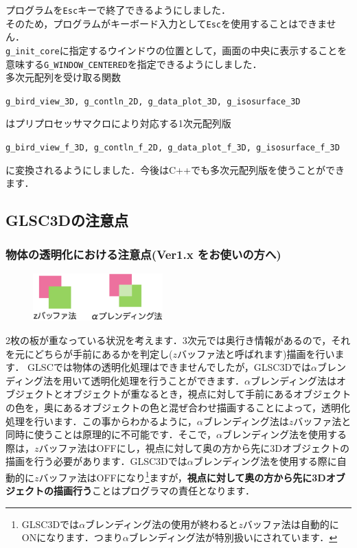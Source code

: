 \documentclass[platex,a4paper,12pt]{jsarticle}%
\begin{document}
プログラムを\verb|Esc|キーで終了できるようにしました．\\
そのため，プログラムがキーボード入力として\verb|Esc|を使用することはできません．\\

\verb|g_init_core|に指定するウインドウの位置として，画面の中央に表示することを意味する\verb|G_WINDOW_CENTERED|を指定できるようにしました．\\

多次元配列を受け取る関数
\begin{center}
	\verb|g_bird_view_3D, g_contln_2D, g_data_plot_3D, g_isosurface_3D|
\end{center}
はプリプロセッサマクロにより対応する1次元配列版
\begin{center}
	\verb|g_bird_view_f_3D, g_contln_f_2D, g_data_plot_f_3D, g_isosurface_f_3D|
\end{center}
に変換されるようにしました．今後はC++でも多次元配列版を使うことができます．

\newpage
\subsection{GLSC3Dの注意点}

\subsubsection{物体の透明化における注意点(Ver1.x をお使いの方へ)}

\begin{figure}
\vspace{-1\baselineskip}
	\includegraphics[width=50mm]{004.eps}
\end{figure}

2枚の板が重なっている状況を考えます．3次元では奥行き情報があるので，それを元にどちらが手前にあるかを判定し($z$バッファ法と呼ばれます)描画を行います．
GLSCでは物体の透明化処理はできませんでしたが，GLSC3Dでは$\alpha$ブレンディング法を用いて透明化処理を行うことができます．$\alpha$ブレンディング法はオブジェクトとオブジェクトが重なるとき，視点に対して手前にあるオブジェクトの色を，奥にあるオブジェクトの色と混ぜ合わせ描画することによって，透明化処理を行います．この事からわかるように，$\alpha$ブレンディング法は$z$バッファ法と同時に使うことは原理的に不可能です．そこで，$\alpha$ブレンディング法を使用する際は，$z$バッファ法はOFFにし，視点に対して奥の方から先に3Dオブジェクトの描画を行う必要があります．GLSC3Dでは$\alpha$ブレンディング法を使用する際に自動的に$z$バッファ法はOFFになり\footnote{GLSC3Dでは$\alpha$ブレンディング法の使用が終わると$z$バッファ法は自動的にONになります．つまり$\alpha$ブレンディング法が特別扱いにされています．}ますが，{\bf 視点に対して奥の方から先に3Dオブジェクトの描画行う}ことはプログラマの責任となります．
\end{document}
